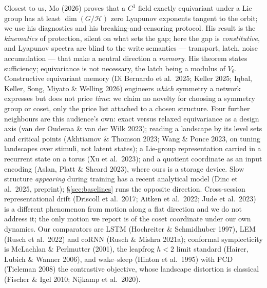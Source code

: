 \documentclass{article}
\begin{document}
Closest to us, Mo (2026) proves that a $C^1$ field exactly equivariant under a Lie group has at least $\dim(G/\mathcal H)$ zero Lyapunov exponents tangent to the orbit; we use his diagnostics and his breaking-and-censoring protocol. His result is the \emph{kinematics} of protection, silent on what sets the gap; here the gap is \emph{constitutive}, and Lyapunov spectra are blind to the write semantics --- transport, latch, noise accumulation --- that make a neutral direction a \emph{memory}. His theorem states sufficiency; equivariance is not necessary, the latch being a modulus of $V_\theta$. Constructive equivariant memory (Di Bernardo et al.\ 2025; Keller 2025; Iqbal, Keller, Song, Miyato \& Welling 2026) engineers \emph{which} symmetry a network expresses but does not price \emph{time}: we claim no novelty for choosing a symmetry group or coset, only the price list attached to a chosen structure. Four further neighbours are this audience's own: exact versus relaxed equivariance as a design axis (van der Ouderaa \& van der Wilk 2023); reading a landscape by its level sets and critical points (Akhtiamov \& Thomson 2023; Wang \& Ponce 2023, on tuning landscapes over stimuli, not latent states); a Lie-group representation carried in a recurrent state on a torus (Xu et al.\ 2023); and a quotient coordinate as an input encoding (Aslan, Platt \& Sheard 2023), where ours is a storage device. Slow structure \emph{appearing} during training has a recent analytical model (Dinc et al.\ 2025, preprint); \S\ref{sec:baselines} runs the opposite direction. Cross-session representational drift (Driscoll et al.\ 2017; Aitken et al.\ 2022; Jude et al.\ 2023) is a different phenomenon from motion along a flat direction and we do not address it; the only motion we report is of the coset coordinate under our own dynamics. Our comparators are LSTM (Hochreiter \& Schmidhuber 1997), LEM (Rusch et al.\ 2022) and coRNN (Rusch \& Mishra 2021a); conformal symplecticity is McLachlan \& Perlmutter (2001), the leapfrog $h<2$ limit standard (Hairer, Lubich \& Wanner 2006), and wake--sleep (Hinton et al.\ 1995) with PCD (Tieleman 2008) the contrastive objective, whose landscape distortion is classical (Fischer \& Igel 2010; Nijkamp et al.\ 2020).
\end{document}
